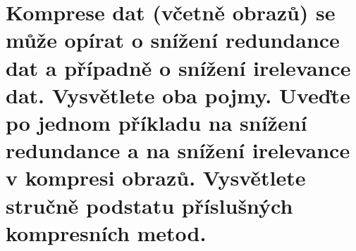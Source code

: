 \section{Komprese dat (včetně obrazů) se může opírat o snížení redundance dat a případně o snížení irelevance dat. 
Vysvětlete oba pojmy. Uveďte po jednom příkladu na snížení redundance a na snížení irelevance v kompresi obrazů. 
Vysvětlete stručně podstatu příslušných kompresních metod.}